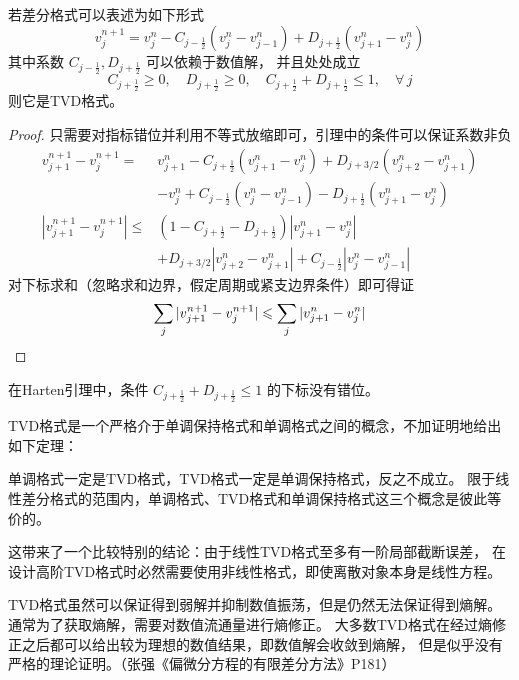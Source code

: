 \begin{lemma}[Harten引理]
    若差分格式可以表述为如下形式
    \[
        v_j^{n+1} = v_j^n - C_{j-\frac12}(v_j^n - v_{j-1}^n) + D_{j+\frac12}(v_{j+1}^n - v_j^n)
    \]
    其中系数 $C_{j-\frac12}, D_{j+\frac12}$ 可以依赖于数值解，
    并且处处成立
    \[
        C_{j+\frac12} \ge 0,\quad D_{j+\frac12} \ge 0,\quad C_{j+\frac12} + D_{j+\frac12} \le 1,\quad \forall\, j
    \]
    则它是TVD格式。
\end{lemma}
\begin{proof}
    只需要对指标错位并利用不等式放缩即可，引理中的条件可以保证系数非负
    \begin{align*}
        v_{j+1}^{n+1} - v_j^{n+1} ={}     &
        v_{j+1}^n - C_{j+\frac12}(v_{j+1}^n - v_{j}^n) + D_{j+3/2}(v_{j+2}^n - v_{j+1}^n)
        \\
                                          & -  v_j^n + C_{j-\frac12}(v_j^n - v_{j-1}^n) - D_{j+\frac12}(v_{j+1}^n - v_j^n)
        \\
        |v_{j+1}^{n+1} - v_j^{n+1}| \le{} &
        (1-C_{j+\frac12} - D_{j+\frac12})|v_{j+1}^n - v_j^n|                                                               \\
                                          & + D_{j+3/2}|v_{j+2}^n - v_{j+1}^n|
        + C_{j-\frac12}|v_j^n - v_{j-1}^n|
    \end{align*}
    对下标求和（忽略求和边界，假定周期或紧支边界条件）即可得证
    \[
        \sum_j |v_{j+1}^{n+1} - v_j^{n+1}| \le \sum_j |v_{j+1}^{n} - v_j^{n}| \qedhere
    \]
\end{proof}

\begin{remark}
    在Harten引理中，条件 $C_{j+\frac12} + D_{j+\frac12} \le 1$ 的下标没有错位。
\end{remark}

TVD格式是一个严格介于单调保持格式和单调格式之间的概念，不加证明地给出如下定理：
\begin{theorem}
    单调格式一定是TVD格式，TVD格式一定是单调保持格式，反之不成立。
    限于线性差分格式的范围内，单调格式、TVD格式和单调保持格式这三个概念是彼此等价的。
\end{theorem}

这带来了一个比较特别的结论：由于线性TVD格式至多有一阶局部截断误差，
在设计高阶TVD格式时必然需要使用非线性格式，即使离散对象本身是线性方程。

TVD格式虽然可以保证得到弱解并抑制数值振荡，但是仍然无法保证得到熵解。
通常为了获取熵解，需要对数值流通量进行熵修正。
大多数TVD格式在经过熵修正之后都可以给出较为理想的数值结果，即数值解会收敛到熵解，
但是似乎没有严格的理论证明。（张强《偏微分方程的有限差分方法》P181）

